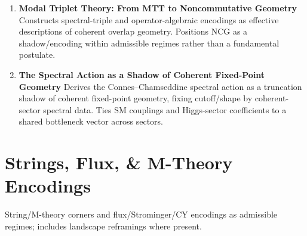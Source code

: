 \documentclass[11pt]{article}
\begin{document}
\begin{enumerate}[leftmargin=*]
Reinterprets Wilsonian effective field theory as the inevitable consequence of noninjective projection under finite admissibility rather than as an approximation to fundamental dynamics. Identifies integrating out degrees of freedom as projection, the cutoff as an admissibility boundary, renormalization group flow as induced effective evolution, and universality as equivalence under projection. Explains RG irreversibility, fixed points, and EFT breakdown as structural consequences of admissibility exhaustion, and shows how Modal Triplet Theory provides an explicit realization in which EFT arises as a coherent-sector shadow.
\item \textbf{Modal Triplet Theory: From MTT to Noncommutative Geometry} Constructs spectral-triple and operator-algebraic encodings as effective descriptions of coherent overlap geometry. Positions NCG as a shadow/encoding within admissible regimes rather than a fundamental postulate.
\item \textbf{The Spectral Action as a Shadow of Coherent Fixed-Point Geometry} Derives the Connes–Chamseddine spectral action as a truncation shadow of coherent fixed-point geometry, fixing cutoff/shape by coherent-sector spectral data. Ties SM couplings and Higgs-sector coefficients to a shared bottleneck vector across sectors.
\end{enumerate}

\section{Strings, Flux, \& M-Theory Encodings}
String/M-theory corners and flux/Strominger/CY encodings as admissible regimes; includes landscape reframings where present.
\end{document}
